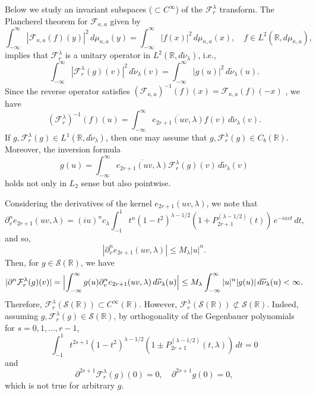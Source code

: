 \documentclass[12pt,twoside,reqno]{amsart}\usepackage[cp1251]{inputenc}
\theoremstyle{plain}
\theoremstyle{remark}
\begin{document}
Below we study  an invariant subspaces ($\subset C^{\infty}$) of the $\mathcal{F}_{r}^{\lambda}$ transform.
The Plancherel theorem for $\mathcal{F}_{\kappa,a}$ given by
\[
\int_{-\infty}^{\infty}|\mathcal{F}_{\kappa,a}(f)(y)|^2\,d\mu_{\kappa,a}(y)=\int_{-\infty}^{\infty}|f(x)|^2\,d\mu_{\kappa,a}(x), \quad f\in L^{2}(\mathbb{R},d\mu_{\kappa,a}),
\]
implies
that $\mathcal{F}_{r}^{\lambda}$ is  a unitary operator in $L^{2}(\mathbb{R},d\widetilde{\nu}_{\lambda})$, i.e.,
\[
\int_{-\infty}^{\infty}|\mathcal{F}_{r}^{\lambda}(g)(v)|^2\,d\widetilde{\nu}_{\lambda}(v)
=\int_{-\infty}^{\infty}|g(u)|^2\,d\widetilde{\nu}_{\lambda}(u).
\]
Since  the reverse operator satisfies $(\mathcal{F}_{\kappa,a})^{-1}(f)(x)=\mathcal{F}_{\kappa,a}(f)(-x)$ \cite[Theorem 5.3]{SKO12},
we have \begin{equation*}
(\mathcal{F}_{r}^{\lambda})^{-1}(f)(u)=\int_{-\infty}^{\infty}\overline{e_{2r+1}(uv,\lambda)}f(v)
\,d\widetilde{\nu}_{\lambda}(v).
\end{equation*}
If $g, \mathcal{F}_{r}^{\lambda}(g)\in L^{1}(\mathbb{R},d\widetilde{\nu}_{\lambda})$, then one may assume that  $g, \mathcal{F}_{r}^{\lambda}(g)\in C_b(\mathbb{R})$. Moreover,
the   inversion formula
\begin{equation}\label{eq28}
g(u)=\int_{-\infty}^{\infty}\overline{e_{2r+1}(uv,\lambda)}\mathcal{F}_{r}^{\lambda}(g)(v)\,d\widetilde{\nu}_{\lambda}(v)
\end{equation}
holds not only in $L_2$ sense
but also pointwise.

Considering the derivatives of the kernel $e_{2r+1}(uv,\lambda)$, we note that
\[
\partial_{v}^{n}e_{2r+1}(uv,\lambda)=(iu)^{n}c_{\lambda}\int_{-1}^{1}t^{n}
(1-t^2)^{\lambda-1/2}(1+P_{2r+1}^{(\lambda-1/2)}(t))\,e^{-iuvt}\,dt,
\]
and so,
\[
|\partial_{v}^{n}e_{2r+1}(uv,\lambda)|\le M_{\lambda}|u|^{n}.
\]
Then, for $g\in \mathcal{S}(\mathbb{R})$, we have
\begin{equation}\label{eq29}
|\partial^{n}\mathcal{F}_{r}^{\lambda}(g)(v)|=\Bigl|\int_{-\infty}^{\infty}g(u)\partial_{v}^{n}e_{2r+1}(uv,\lambda)
\,d\widetilde{\nu}_{\lambda}(u)\Bigr|\le M_{\lambda}\int_{-\infty}^{\infty}|u|^{n}|g(u)|\,d\widetilde{\nu}_{\lambda}(u)<\infty.
\end{equation}
Therefore, $\mathcal{F}_{r}^{\lambda}(\mathcal{S}(\mathbb{R}))\subset C^{\infty}(\mathbb{R})$. However, $\mathcal{F}_{r}^{\lambda}(\mathcal{S}(\mathbb{R}))\not\subset \mathcal{S}(\mathbb{R})$. Indeed, assuming $g,\mathcal{F}_{r}^{\lambda}(g)\in \mathcal{S}(\mathbb{R})$, by
orthogonality of the Gegenbauer polynomials for $s=0,1,\dots,r-1$,
\[
\int_{-1}^{1}t^{2s+1}
(1-t^2)^{\lambda-1/2}(1\pm P_{2r+1}^{(\lambda-1/2)}(t,\lambda))\,dt=0
\]
and
\begin{equation}\label{eq30}
\partial^{2s+1}\mathcal{F}_{r}^{\lambda}(g)(0)=0,\quad
\partial^{2s+1}g(0)=0,
\end{equation}
which is not true for arbitrary $g$.
\end{document}
